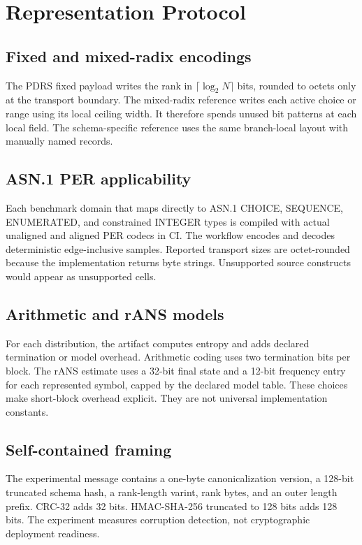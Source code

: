 \section{Representation Protocol}
\subsection{Fixed and mixed-radix encodings}
The PDRS fixed payload writes the rank in \(\lceil\log_2N\rceil\) bits, rounded to octets only at the transport boundary. The mixed-radix reference writes each active choice or range using its local ceiling width. It therefore spends unused bit patterns at each local field. The schema-specific reference uses the same branch-local layout with manually named records.

\subsection{ASN.1 PER applicability}
Each benchmark domain that maps directly to ASN.1 CHOICE, SEQUENCE, ENUMERATED, and constrained INTEGER types is compiled with actual unaligned and aligned PER codecs in CI. The workflow encodes and decodes deterministic edge-inclusive samples. Reported transport sizes are octet-rounded because the implementation returns byte strings. Unsupported source constructs would appear as unsupported cells.

\subsection{Arithmetic and rANS models}
For each distribution, the artifact computes entropy and adds declared termination or model overhead. Arithmetic coding uses two termination bits per block. The rANS estimate uses a 32-bit final state and a 12-bit frequency entry for each represented symbol, capped by the declared model table. These choices make short-block overhead explicit. They are not universal implementation constants.

\subsection{Self-contained framing}
The experimental message contains a one-byte canonicalization version, a 128-bit truncated schema hash, a rank-length varint, rank bytes, and an outer length prefix. CRC-32 adds 32 bits. HMAC-SHA-256 truncated to 128 bits adds 128 bits. The experiment measures corruption detection, not cryptographic deployment readiness.
